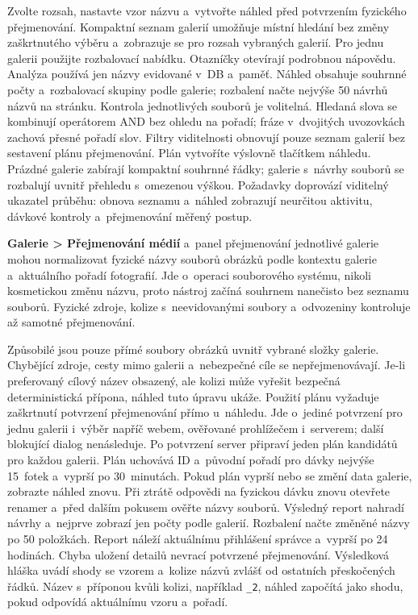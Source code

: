 \documentclass[11pt,a4paper]{article}
\newcommand{\ui}[1]{\textbf{#1}}
\newcommand{\codeword}[1]{\nolinkurl{#1}}
\begin{document}
Zvolte rozsah, nastavte vzor názvu a~vytvořte náhled před potvrzením fyzického
přejmenování. Kompaktní seznam galerií umožňuje místní hledání bez změny
zaškrtnutého výběru a~zobrazuje se pro rozsah vybraných galerií. Pro jednu
galerii použijte rozbalovací nabídku. Otazníčky otevírají podrobnou nápovědu.
Analýza používá jen názvy evidované v~DB a~paměť. Náhled obsahuje souhrnné počty
a~rozbalovací skupiny podle galerie; rozbalení načte nejvýše 50 návrhů názvů
na stránku. Kontrola jednotlivých souborů je volitelná.
Hledaná slova se kombinují operátorem AND bez ohledu na pořadí; fráze
v~dvojitých uvozovkách zachová přesné pořadí slov. Filtry viditelnosti obnovují
pouze seznam galerií bez sestavení plánu přejmenování. Plán vytvoříte výslovně
tlačítkem náhledu. Prázdné galerie zabírají kompaktní souhrnné řádky; galerie
s~návrhy souborů se rozbalují uvnitř přehledu s~omezenou výškou. Požadavky
doprovází viditelný ukazatel průběhu: obnova seznamu a~náhled zobrazují
neurčitou aktivitu, dávkové kontroly a~přejmenování měřený postup.

\ui{Galerie > Přejmenování médií} a~panel přejmenování jednotlivé galerie mohou
normalizovat fyzické názvy souborů obrázků podle kontextu galerie a~aktuálního
pořadí fotografií. Jde o~operaci souborového systému, nikoli kosmetickou změnu
názvu, proto nástroj začíná souhrnem nanečisto bez seznamu souborů. Fyzické
zdroje, kolize s~neevidovanými soubory a~odvozeniny kontroluje až samotné
přejmenování.

Způsobilé jsou pouze přímé soubory obrázků uvnitř vybrané složky galerie.
Chybějící zdroje, cesty mimo galerii a~nebezpečné cíle se nepřejmenovávají.
Je-li preferovaný cílový název obsazený, ale kolizi může vyřešit bezpečná
deterministická přípona, náhled tuto úpravu ukáže. Použití plánu vyžaduje
zaškrtnutí potvrzení přejmenování přímo u~náhledu. Jde o~jediné potvrzení pro jednu
galerii i~výběr napříč webem, ověřované prohlížečem i~serverem; další blokující
dialog nenásleduje.
Po potvrzení server připraví jeden plán kandidátů pro každou galerii. Plán
uchovává ID a~původní pořadí pro dávky nejvýše 15~fotek a~vyprší po 30~minutách.
Pokud plán vyprší nebo se změní data galerie, zobrazte náhled znovu. Při ztrátě
odpovědi na fyzickou dávku znovu otevřete renamer a~před dalším pokusem ověřte
názvy souborů. Výsledný report nahradí návrhy a~nejprve zobrazí jen počty podle
galerií. Rozbalení načte
změněné názvy po 50 položkách. Report náleží aktuálnímu přihlášení správce
a~vyprší po 24 hodinách. Chyba uložení detailů nevrací potvrzené přejmenování.
Výsledková hláška uvádí shody se vzorem a~kolize názvů zvlášť od ostatních
přeskočených řádků.
Název s~příponou kvůli kolizi, například \codeword{\_2}, náhled započítá
jako shodu, pokud odpovídá aktuálnímu vzoru a~pořadí.
\end{document}

